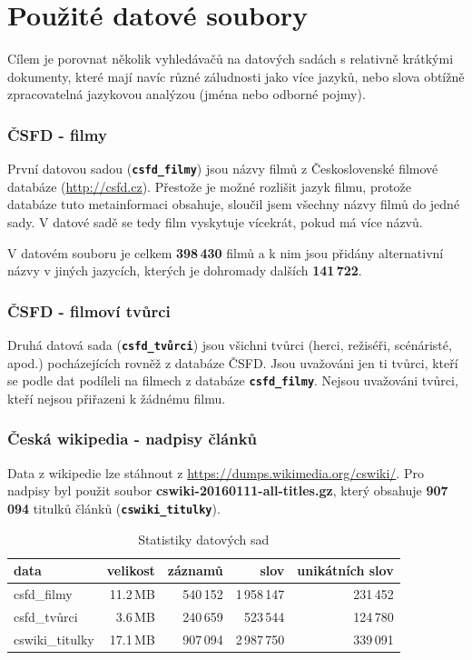 \documentclass[11pt,letterpaper,oneside,openright]{book}
\newcommand{\bftt}[1]{\texttt{\textbf{#1}}}
\begin{document}
\section{Použité datové soubory}
Cílem je porovnat několik vyhledávačů na datových sadách s relativně krátkými
dokumenty, které mají navíc různé záludnosti jako více jazyků, nebo slova
obtížně zpracovatelná jazykovou analýzou (jména nebo odborné pojmy).

\subsubsection{ČSFD - filmy}
První datovou sadou (\bftt{csfd\_filmy}) jsou názvy filmů z Československé
filmové databáze (\url{http://csfd.cz}). Přestože je možné rozlišit jazyk
filmu, protože databáze tuto metainformaci obsahuje, sloučil jsem všechny názvy
filmů do jedné sady. V datové sadě se tedy film vyskytuje vícekrát, pokud má
více názvů.

V datovém souboru je celkem \textbf{398\,430} filmů a k nim jsou přidány
alternativní názvy v jiných jazycích, kterých je dohromady dalších
\textbf{141\,722}.

\subsubsection{ČSFD - filmoví tvůrci}
Druhá datová sada (\bftt{csfd\_tvůrci}) jsou všichni tvůrci (herci, režiséři,
scénáristé, apod.) pocházejících rovněž z databáze ČSFD. Jsou uvažováni jen ti
tvůrci, kteří se podle dat podíleli na filmech z databáze \bftt{csfd\_filmy}.
Nejsou uvažováni tvůrci, kteří nejsou přiřazeni k žádnému filmu.

\subsubsection{Česká wikipedia - nadpisy článků}
Data z wikipedie lze stáhnout z \url{https://dumps.wikimedia.org/cswiki/}. Pro
nadpisy byl použit soubor \textbf{cswiki-20160111-all-titles.gz}, který
obsahuje \textbf{907\,094} titulků článků (\bftt{cswiki\_titulky}).


\mbox{}
\begin{tt}
\begin{table}[H]
\centering
\begin{tabulary}{\textwidth}{LRRRR}
\textbf{data} & \textbf{velikost} & \textbf{záznamů} & \textbf{slov} & \textbf{unikátních slov} \\
\hline
csfd\_filmy     & 11.2\,MB & 540\,152 & 1\,958\,147 & 231\,452 \\
csfd\_tvůrci    & 3.6\,MB  & 240\,659 & 523\,544    & 124\,780 \\
cswiki\_titulky & 17.1\,MB & 907\,094 & 2\,987\,750 & 339\,091 \\
\hline
\end{tabulary}
\caption{Statistiky datových sad}
\label{tab:data_stats}
\end{table}
\end{tt}
\end{document}
